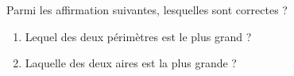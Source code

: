 
\begin{mental}

Parmi les affirmation suivantes, lesquelles sont correctes ?

\begin{center}
    
\end{center}

\begin{enumerate}
    \item
        Lequel des deux périmètres est le plus grand ?
    \item
        Laquelle des deux aires est la plus grande ?
\end{enumerate}

\end{mental}
